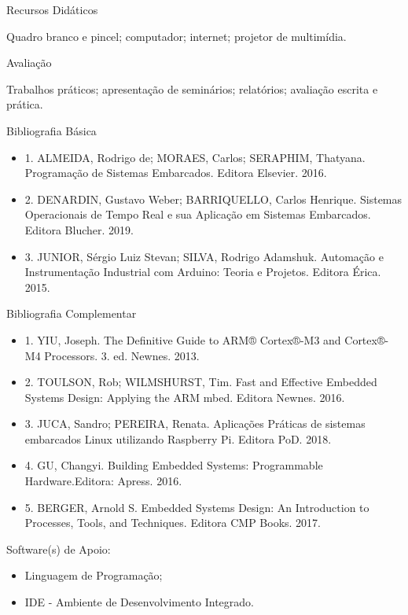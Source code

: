 \documentclass{article}
\begin{document}
\begin{center}
Recursos Didáticos
\end{center}
Quadro branco e pincel; computador; internet; projetor de multimídia.

\begin{center}
Avaliação
\end{center}
Trabalhos práticos; apresentação de seminários; relatórios; avaliação escrita e prática.

\begin{center}
Bibliografia Básica
\end{center}
\begin{itemize}
      \item 1. ALMEIDA, Rodrigo de; MORAES, Carlos; SERAPHIM, Thatyana. Programação de Sistemas Embarcados. Editora Elsevier. 2016.
      \item 2. DENARDIN, Gustavo Weber; BARRIQUELLO, Carlos Henrique. Sistemas Operacionais de Tempo Real e sua Aplicação em Sistemas Embarcados. Editora Blucher. 2019.
      \item 3. JUNIOR, Sérgio Luiz Stevan; SILVA, Rodrigo Adamshuk. Automação e Instrumentação Industrial com Arduino: Teoria e Projetos. Editora Érica. 2015.
\end{itemize}

\begin{center}
Bibliografia Complementar
\end{center}
\begin{itemize}
      \item 1. YIU, Joseph. The Definitive Guide to ARM® Cortex®-M3 and Cortex®-M4 Processors. 3. ed. Newnes. 2013.
      \item 2. TOULSON, Rob; WILMSHURST, Tim. Fast and Effective Embedded Systems Design: Applying the ARM mbed. Editora Newnes. 2016.
      \item 3. JUCA, Sandro; PEREIRA, Renata. Aplicações Práticas de sistemas embarcados Linux utilizando Raspberry Pi. Editora PoD. 2018.
      \item 4. GU, Changyi. Building Embedded Systems: Programmable Hardware.Editora: Apress. 2016.
      \item 5. BERGER, Arnold S. Embedded Systems Design: An Introduction to Processes, Tools, and Techniques. Editora CMP Books. 2017.
\end{itemize}

\begin{center}
Software(s) de Apoio:
\end{center}
\begin{itemize}
      \item Linguagem de Programação;
      \item IDE - Ambiente de Desenvolvimento Integrado.
\end{itemize}
\end{document}
